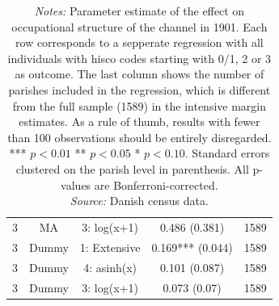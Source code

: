 \begin{table}
\begin{tabular}{ccccc}
3 & MA & 3: log(x+1) & 0.486 (0.381) & 1589\\
3 & Dummy & 1: Extensive & 0.169*** (0.044) & 1589\\
3 & Dummy & 4: asinh(x) & 0.101 (0.087) & 1589\\
3 & Dummy & 3: log(x+1) & 0.073 (0.07) & 1589\\
\bottomrule
\end{tabular}
\parbox{0.9\textwidth}{
\caption*{\footnotesize \textit{Notes:} Parameter estimate of the effect on occupational structure of the channel in 1901. Each row corresponds to a sepperate regression with all individuals with hisco codes starting with 0/1, 2 or 3 as outcome. The last column shows the number of parishes included in the regression, which is different from the full sample (1589) in the intensive margin estimates. As a rule of thumb, results with fewer than 100 observations should be entirely disregarded. *** $p< 0.01$ ** $p< 0.05$ * $p< 0.10$. Standard errors clustered on the parish level in parenthesis. All p-values are Bonferroni-corrected. \\ \textit{Source:} Danish census data.}
}
\end{table}

